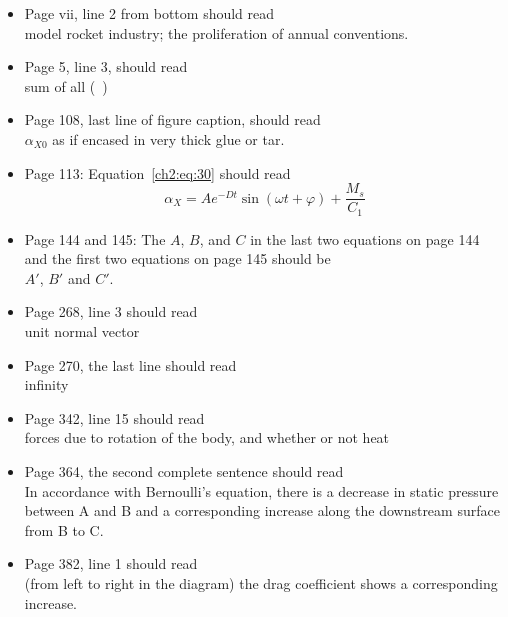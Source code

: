 \begin{itemize}[label={},leftmargin=0pt,itemsep=\medskipamount,parsep=0pt,topsep=\bigskipamount]
\item Page vii, line 2 from bottom should read\\
model rocket industry; the proliferation of annual conventions.

\item Page 5, line 3, should read\\
\makebox[7em][l]{$\Sigma(\ )$}sum of all (~)

\item Page 108, last line of figure caption, should read\\
$\alpha_{X0}$ as if encased in very thick glue or tar.

\item Page 113: Equation~\eqref{ch2:eq:30} should read
\begin{equation*}\tag{30}
\alpha_X = A e^{-Dt}\sin(\omega t + \varphi) + \frac{M_s}{C_1}
\end{equation*}

\item Page 144 and 145: The $A$, $B$, and $C$ in the last two equations on page 144 and the first two
equations on page 145 should be\\
$A'$, $B'$ and $C'$.

\item Page 268, line 3 should read\\
unit normal vector

\item Page 270, the last line should read\\
\makebox[7em][l]{$\infty$}infinity

\item Page 342, line 15 should read\\
forces due to rotation of the body, and whether or not heat

\item Page 364, the second complete sentence should read\\
In accordance with Bernoulli's equation, there is a decrease in static pressure between A and B and a
corresponding increase along the downstream surface from B to C.

\item Page 382, line 1 should read\\
(from left to right in the diagram) the drag coefficient shows a corresponding increase.


\end{itemize}
